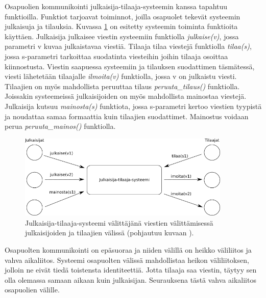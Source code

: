 Osapuolien kommunikointi julkaisija-tilaaja-systeemin kanssa tapahtuu funktioilla. Funktiot tarjoavat toiminnot, joilla osapuolet tekevät systeemin julkaisuja ja tilauksia. Kuvassa \ref{fig:publish-subscribe-communication} on esitetty systeemin toiminta funktioita käyttäen. Julkaisija julkaisee viestin systeemiin funktiolla \emph{julkaise(v)}, jossa parametri v kuvaa julkaistavaa viestiä. Tilaaja tilaa viestejä funktiolla \emph{tilaa(s)}, jossa s-parametri tarkoittaa suodatinta viesteihin joihin tilaaja osoittaa kiinnostusta. Viestin saapuessa systeemiin ja tilauksen suodattimen täsmätessä, viesti lähetetään tilaajalle \emph{ilmoita(v)} funktiolla, jossa v on julkaistu viesti. Tilaajien on myös mahdollista peruuttaa tilaus \emph{peruuta\_tilaus()} funktiolla. Joissakin systeemeissä julkaisijoiden on myös mahdollista mainostaa viestejä. Julkaisija kutsuu \emph{mainosta(s)} funktiota, jossa s-parametri kertoo viestien tyypistä ja noudattaa samaa formaattia kuin tilaajien suodattimet. Mainostus voidaan perua \emph{peruuta\_mainos()} funktiolla. \mbox{\cite[s.~2--3]{baldoni2005distributed}} \mbox{\cite[s.~26--28]{distributed-event-based-systems}}

\begin{figure}[ht!]
	\includegraphics[width=0.9\textwidth]{pictures/publish-subscribe.png}
	\caption{Julkaisija-tilaaja-systeemi välittäjänä viestien välittämisessä julkaisijoiden ja tilaajien välissä (pohjautuu kuvaan \mbox{\cite[s.~246]{distributed-systems-concepts-and-design}}).}
	\label{fig:publish-subscribe-communication}
\end{figure}

Osapuolten kommunikointi on epäsuoraa ja niiden välillä on heikko väliliitos ja vahva aikaliitos. Systeemi osapuolten välissä mahdollistaa heikon väliliitoksen, jolloin ne eivät tiedä toistensta identiteettiä. Jotta tilaaja saa viestin, täytyy sen olla olemassa samaan aikaan kuin julkaisijan. Seurauksena tästä vahva aikaliitos osapuolien välille. 


